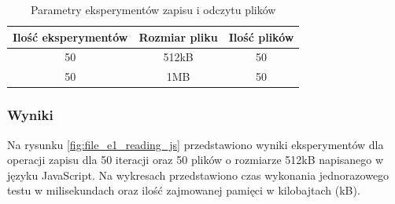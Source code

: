 \begin{table}[H]
  \centering
  \caption{Parametry eksperymentów zapisu i odczytu plików}
  \begin{tabular}{|c|c|c|}
    \hline
    \textbf{Ilość eksperymentów} & \textbf{Rozmiar pliku} & \textbf{Ilość plików} \\ \hline
    50 & 512kB & 50 \\ \hline
    50 & 1MB & 50 \\ \hline
  \end{tabular}
  \label{tab:file_experiments}
\end{table}

\subsubsection{Wyniki}
Na rysunku \ref{fig:file_e1_reading_js} przedstawiono wyniki eksperymentów dla operacji zapisu dla 50 iteracji oraz 50 plików o rozmiarze 512kB napisanego w języku JavaScript. Na wykresach przedstawiono czas wykonania jednorazowego testu w milisekundach oraz ilość zajmowanej pamięci w kilobajtach (kB).

